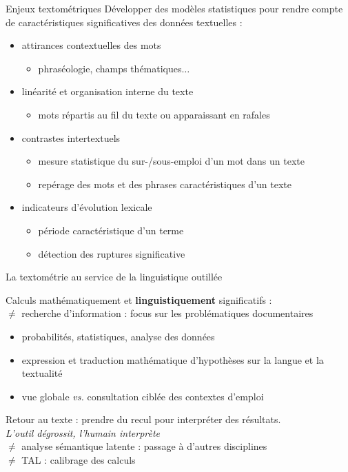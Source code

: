 \documentclass[xetex,xcolor={table,usenames,dvipsnames}]{beamer}
\begin{document}
\begin{frame}{Enjeux textométriques}
	Développer des modèles statistiques pour rendre compte de caractéristiques significatives des données textuelles :
	\begin{itemize}
		\item attirances contextuelles des mots 
		\begin{itemize}
			\item phraséologie, champs thématiques$\dots$
		\end{itemize}
		\item linéarité et organisation interne du texte
		\begin{itemize}
			\item mots répartis au fil du texte ou apparaissant en \og{}rafales\fg{}
		\end{itemize}
		\item contrastes intertextuels 
		\begin{itemize}
			\item mesure statistique du sur-/sous-emploi d’un mot dans un texte
			\item repérage des mots et des phrases caractéristiques d’un texte
		\end{itemize}
		\item indicateurs d’évolution lexicale 
		\begin{itemize}
			\item période caractéristique d’un terme
			\item détection des ruptures significative
		\end{itemize}
	\end{itemize} 
\end{frame}

\begin{frame}{La textométrie au service de la linguistique outillée}
	
	
	
Calculs mathématiquement et \textbf{linguistiquement} significatifs :\\
{\small$\neq$ recherche d'information : focus sur les problématiques documentaires}
	\begin{itemize}
		\item  probabilités, statistiques, analyse des données
		\item expression et traduction mathématique d'hypothèses sur la langue et la textualité
		\item vue globale \textit{vs.} consultation ciblée des contextes d'emploi
	\end{itemize}
	
Retour au texte : prendre du recul pour interpréter des résultats.\\
\og{}\textit{L'outil dégrossit, l'humain interprète}\fg{} \citep{lejeune2023}\\
{\small$\neq$ analyse sémantique latente : passage à d'autres disciplines}\\
{\small$\neq$ \textsc{TAL} : calibrage des calculs}
\end{frame}
\end{document}
